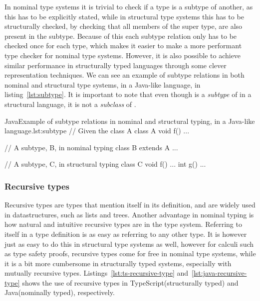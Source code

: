 In nominal type systems it is trivial to check if a type is a subtype of another, as this has to be explicitly stated, while in structural type systems this has to be structurally checked, by checking that all members of the super type, are also present in the subtype.
Because of this each subtype relation only has to be checked once for each type, which makes it easier to make a more performant type checker for nominal type systems.
However, it is also possible to achieve similar performance in structurally typed languages through some clever representation techniques. %
We can see an example of subtype relations in both nominal and structural type systems, in a Java-like language, in listing~\vref{lst:subtype}.
It is important to note that even though  is a \emph{subtype} of  in a structural language, it is not a \emph{subclass} of .

\begin{code}{Java}{Example of subtype relations in nominal and structural typing, in a Java-like language.}{lst:subtype}
    // Given the class A
    class A {
        void f() { ... }
     }

    // A subtype, B, in nominal typing
    class B extends A { ... }

    // A subtype, C, in structural typing
    class C {
        void f() { ... }
        int g() { ... }
    }
\end{code}

\subsubsection{Recursive types}\label{subsubsec:recursive-types}

Recursive types are types that mention itself in its definition, and are widely used in datastructures, such as lists and trees.
Another advantage in nominal typing is how natural and intuitive recursive types are in the type system.
Referring to itself in a type definition is as easy as referring to any other type.
It is however just as easy to do this in structural type systems as well, however for calculi such as type safety proofs, recursive types come for free in nominal type systems, while it is a bit more cumbersome in structurally typed systems, especially with mutually recursive types\cite{tapl}.
Listings~\vref{lst:ts-recursive-type} and~\vref{lst:java-recursive-type} shows the use of recursive types in TypeScript(structurally typed) and Java(nominally typed), respectively.

